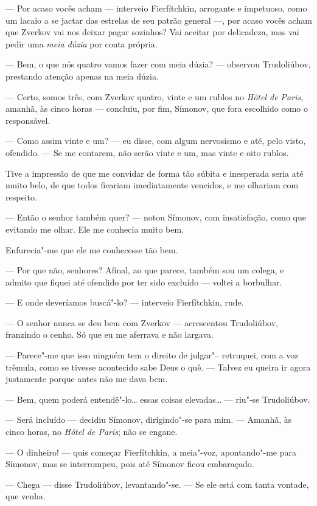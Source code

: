 --- Por acaso vocês acham --- interveio Fierfítchkin, arrogante e
impetuoso, como um lacaio a se jactar das estrelas de seu patrão general
---, por acaso vocês acham que Zverkov vai nos deixar pagar sozinhos? Vai
aceitar por delicadeza, mas vai pedir uma \emph{meia dúzia} por conta
própria.

--- Bem, o que nós quatro vamos fazer com meia dúzia? --- observou
Trudoliúbov, prestando atenção apenas na meia dúzia.

--- Certo, somos três, com Zverkov quatro, vinte e um rublos no
\emph{Hôtel de Paris}, amanhã, às cinco horas --- concluiu, por fim,
Símonov, que fora escolhido como o responsável.

--- Como assim vinte e um? --- eu disse, com algum nervosismo e até, pelo
visto, ofendido. --- Se me contarem, não serão vinte e um, mas vinte e
oito rublos.

Tive a impressão de que me convidar de forma tão súbita e inesperada
seria até muito belo, de que todos ficariam imediatamente vencidos, e me
olhariam com respeito.

--- Então o senhor também quer? --- notou Símonov, com insatisfação, como
que evitando me olhar. Ele me conhecia muito bem.

Enfurecia"-me que ele me conhecesse tão bem.

--- Por que não, senhores? Afinal, ao que parece, também sou um colega, e
admito que fiquei até ofendido por ter sido excluído --- voltei a
borbulhar.

--- E onde deveríamos buscá"-lo? --- interveio Fierfítchkin, rude.

--- O senhor nunca se deu bem com Zverkov --- acrescentou Trudoliúbov,
franzindo o cenho. Só que eu me aferrava e não largava.

--- Parece"-me que isso ninguém tem o direito de julgar"-- retruquei, com a
voz trêmula, como se tivesse acontecido sabe Deus o quê. --- Talvez eu
queira ir agora justamente porque antes não me dava bem.

--- Bem, quem poderá entendê"-lo\ldots{} essas coisas elevadas\ldots{} --- riu"-se
Trudoliúbov.

--- Será incluído --- decidiu Símonov, dirigindo"-se para mim. --- Amanhã, às
cinco horas, no \emph{Hôtel de Paris}; não se engane.

--- O dinheiro! --- quis começar Fierfítchkin, a meia"-voz, apontando"-me para
Símonov, mas se interrompeu, pois até Símonov ficou embaraçado.

--- Chega --- disse Trudoliúbov, levantando"-se. --- Se ele está com tanta
vontade, que venha.

